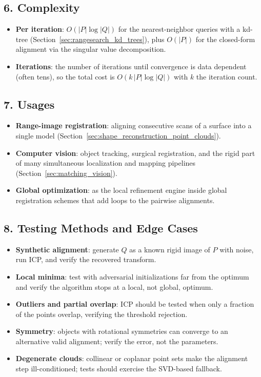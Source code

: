 \subsection{6. Complexity}

\begin{itemize}
\item \textbf{Per iteration}: $O(|P| \log |Q|)$ for the nearest-neighbor
  queries with a kd-tree (Section~\ref{sec:rangesearch_kd_trees}), plus
  $O(|P|)$ for the closed-form alignment via the singular value
  decomposition.
\item \textbf{Iterations}: the number of iterations until convergence is
  data dependent (often tens), so the total cost is $O(k\,|P| \log |Q|)$
  with $k$ the iteration count.
\end{itemize}

\subsection{7. Usages}

\begin{itemize}
\item \textbf{Range-image registration}: aligning consecutive scans of a
  surface into a single model
  \cite{besl1992,chen1992,deberg2008} (Section~\ref{sec:shape_reconstruction_point_clouds}).
\item \textbf{Computer vision}: object tracking, surgical registration, and
  the rigid part of many simultaneous localization and mapping pipelines
  (Section~\ref{sec:matching_vision}).
\item \textbf{Global optimization}: as the local refinement engine inside
  global registration schemes that add loops to the pairwise alignments.
\end{itemize}

\subsection{8. Testing Methods and Edge Cases}

\begin{itemize}
\item \textbf{Synthetic alignment}: generate $Q$ as a known rigid image of
  $P$ with noise, run ICP, and verify the recovered transform.
\item \textbf{Local minima}: test with adversarial initializations far from
  the optimum and verify the algorithm stops at a local, not global, optimum.
\item \textbf{Outliers and partial overlap}: ICP should be tested when only
  a fraction of the points overlap, verifying the threshold rejection.
\item \textbf{Symmetry}: objects with rotational symmetries can converge to
  an alternative valid alignment; verify the error, not the parameters.
\item \textbf{Degenerate clouds}: collinear or coplanar point sets make the
  alignment step ill-conditioned; tests should exercise the SVD-based
  fallback.
\end{itemize}

